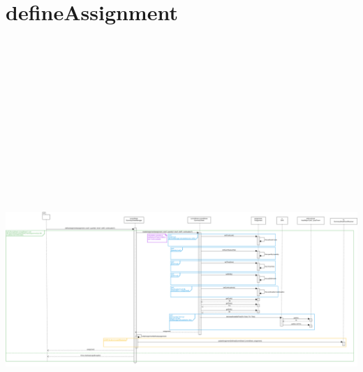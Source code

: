 \section{defineAssignment}
\centering\includegraphics[max width=\textwidth, max height=190mm]{../resources/img/GCC/DSD/op5.png}


